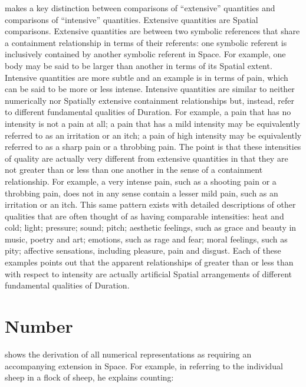 \cite{bergson:1910} makes a key distinction between comparisons of
``extensive'' quantities and comparisons of ``intensive'' quantities.
Extensive quantities are Spatial comparisons.  Extensive quantities
are between two symbolic references that share a containment
relationship in terms of their referents: one symbolic referent is
inclusively contained by another symbolic referent in Space.  For
example, one body may be said to be larger than another in terms of
its Spatial extent.  Intensive quantities are more subtle and an
example is in terms of pain, which can be said to be more or less
intense.  Intensive quantities are similar to neither numerically nor
Spatially extensive containment relationships but, instead, refer to
different fundamental qualities of Duration.  For example, a pain that
has no intensity is not a pain at all; a pain that has a mild
intensity may be equivalently referred to as an irritation or an itch;
a pain of high intensity may be equivalently referred to as a sharp
pain or a throbbing pain.  The point is that these intensities of
quality are actually very different from extensive quantities in that
they are not greater than or less than one another in the sense of a
containment relationship.  For example, a very intense pain, such as a
shooting pain or a throbbing pain, does not in any sense contain a
lesser mild pain, such as an irritation or an itch.  This same pattern
exists with detailed descriptions of other qualities that are often
thought of as having comparable intensities: heat and cold; light;
pressure; sound; pitch; aesthetic feelings, such as grace and beauty
in music, poetry and art; emotions, such as rage and fear; moral
feelings, such as pity; affective sensations, including pleasure, pain
and disgust.  Each of these examples points out that the apparent
relationships of greater than or less than with respect to intensity
are actually artificial Spatial arrangements of different fundamental
qualities of Duration.

\section{Number}
\label{section:number}

\cite{bergson:1910} shows the derivation of all numerical
representations as requiring an accompanying extension in Space.  For
example, in referring to the individual sheep in a flock of sheep, he
explains counting:

